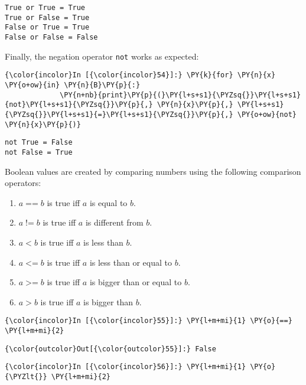 \begin{Verbatim}[commandchars=\\\{\}]
True or True = True
True or False = True
False or True = True
False or False = False
\end{Verbatim}
Finally, the negation operator \texttt{not} works as expected:

\begin{Verbatim}[commandchars=\\\{\}]
{\color{incolor}In [{\color{incolor}54}]:} \PY{k}{for} \PY{n}{x} \PY{o+ow}{in} \PY{n}{B}\PY{p}{:}
             \PY{n+nb}{print}\PY{p}{(}\PY{l+s+s1}{\PYZsq{}}\PY{l+s+s1}{not}\PY{l+s+s1}{\PYZsq{}}\PY{p}{,} \PY{n}{x}\PY{p}{,} \PY{l+s+s1}{\PYZsq{}}\PY{l+s+s1}{=}\PY{l+s+s1}{\PYZsq{}}\PY{p}{,} \PY{o+ow}{not} \PY{n}{x}\PY{p}{)}
\end{Verbatim}

\begin{Verbatim}[commandchars=\\\{\}]
not True = False
not False = True
\end{Verbatim}
Boolean values are created by comparing numbers using the following comparison operators:
\begin{enumerate}
\item $a\;\texttt{==}\;b$ is true iff $a$ is equal to $b$.
\item $a\;\texttt{!=}\;b$ is true iff $a$ is different from $b$.
\item $a\;\texttt{<}\;b$ is true iff $a$ is less than $b$.
\item $a\;\texttt{<=}\;b$ is true iff $a$ is less than or equal to $b$.
\item $a\;\texttt{>=}\;b$ is true iff $a$ is bigger than or equal to $b$.
\item $a\;\texttt{>}\;b$ is true iff $a$ is bigger than $b$.
\end{enumerate}

\begin{Verbatim}[commandchars=\\\{\}]
{\color{incolor}In [{\color{incolor}55}]:} \PY{l+m+mi}{1} \PY{o}{==} \PY{l+m+mi}{2}
\end{Verbatim}


\begin{Verbatim}[commandchars=\\\{\}]
{\color{outcolor}Out[{\color{outcolor}55}]:} False
\end{Verbatim}
            
\begin{Verbatim}[commandchars=\\\{\}]
{\color{incolor}In [{\color{incolor}56}]:} \PY{l+m+mi}{1} \PY{o}{\PYZlt{}} \PY{l+m+mi}{2}
\end{Verbatim}



